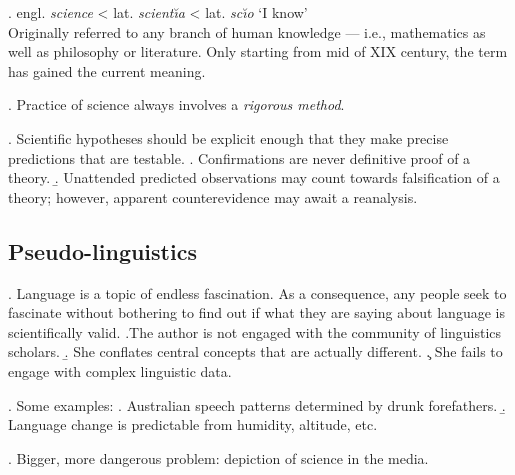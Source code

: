 \documentclass[11pt, oneside]{article}   	%
\begin{document}
\ex. engl. {\itshape science} < lat. {\itshape scient{\u \i}a} < lat. {\itshape sc{\u \i}o} `I know' \\
Originally referred to any branch of human knowledge --- i.e., mathematics as well as philosophy or literature. Only starting from mid of XIX century, the term has gained the current meaning. 

\ex. Practice of science always involves a {\itshape rigorous method}.

\begin{center}
\end{center}

\ex. Scientific hypotheses should be explicit enough that they make precise predictions that are testable. 
\a. Confirmations are never definitive proof of a theory.
\b. Unattended predicted observations may count towards falsification of a theory; however, apparent counterevidence may await a reanalysis.

\subsection{Pseudo-linguistics}

\ex. Language is a topic of endless fascination. As a consequence, any people seek to fascinate without bothering to find out if what they are saying about language is scientifically valid.
\a.The author is not engaged with the community of linguistics scholars.
\b. She conflates central concepts that are actually different. 
\c. She fails to engage with complex linguistic data.

\ex. Some examples:
\a. Australian speech patterns determined by drunk forefathers.
\b. Language change is predictable from humidity, altitude, etc.

\ex. Bigger, more dangerous problem: depiction of science in the media.
\end{document}
